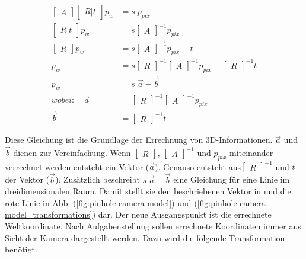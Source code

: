 	\begin{equation}
	\begin{aligned}
	\begin{bmatrix} A \end{bmatrix} \begin{bmatrix} R|t \end{bmatrix} p_w &= s \; p_{pix} \\
	\begin{bmatrix} R|t \end{bmatrix} p_w &= s \begin{bmatrix} A \end{bmatrix}^{-1} p_{pix} \\
	\begin{bmatrix} R \end{bmatrix} p_w &= s \begin{bmatrix} A \end{bmatrix}^{-1} p_{pix} - t \\
	p_w &= s \begin{bmatrix} R \end{bmatrix}^{-1} \begin{bmatrix} A \end{bmatrix}^{-1} p_{pix} - \begin{bmatrix} R \end{bmatrix}^{-1} t \\
	p_w &= s \; \vec{a} - \vec{b} \\
	wobei: \quad \vec{a} & = \begin{bmatrix} R \end{bmatrix}^{-1} \begin{bmatrix} A \end{bmatrix}^{-1} p_{pix} \\
	\vec{b} &= \begin{bmatrix} R \end{bmatrix}^{-1} t
	\end{aligned}
	\label{eq:pixel_zu_welt}
	\end{equation}
	
	Diese Gleichung ist die Grundlage der Errechnung von 3D-Informationen. \( \vec{a} \) und \( \vec{b} \) dienen zur Vereinfachung. Wenn \( \begin{bmatrix} R \end{bmatrix} \), \( \begin{bmatrix} A \end{bmatrix}^{-1} \) und \( p_{pix} \) miteinander verrechnet werden entsteht ein Vektor (\( \vec{a} \)). Genauso entsteht aus\( \begin{bmatrix} R \end{bmatrix}^{-1} \) und \( t \) der Vektor (\( \vec{b} \)). Zusätzlich beschreibt \( s \; \vec{a} - \vec{b} \) eine Gleichung für eine Linie im dreidimensionalen Raum. Damit stellt sie den beschriebenen Vektor in \citep[S. 3]{dawson-howe_simple_1994} und die rote Linie in Abb. (\ref{fig:pinhole-camera-model}) und (\ref{fig:pinhole-camera-model_transformations}) dar. \newline
	Der neue Ausgangspunkt ist die errechnete Weltkoordinate. Nach Aufgabenstellung sollen errechnete Koordinaten immer aus Sicht der Kamera dargestellt werden. Dazu wird die folgende Transformation benötigt. 
	
